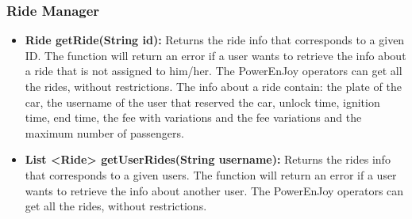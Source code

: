 \subsubsection{Ride Manager}
\begin{itemize}
	\item \textbf{Ride getRide(String id):} Returns the ride info that corresponds to a given ID. The function will return an error if a user wants to retrieve the info about a ride that is not assigned to him/her.
	The PowerEnJoy operators can get all the rides, without restrictions.
	The info about a ride contain: the plate of the car, the username of the user that reserved the car, unlock time, ignition time, end time, the fee with variations and the fee variations and the maximum number of passengers.
	\item \textbf{List \textless Ride\textgreater{} getUserRides(String username):} Returns the rides info that corresponds to a given users. The function will return an error if a user wants to retrieve the info about another user.
	The PowerEnJoy operators can get all the rides, without restrictions.
\end{itemize}

